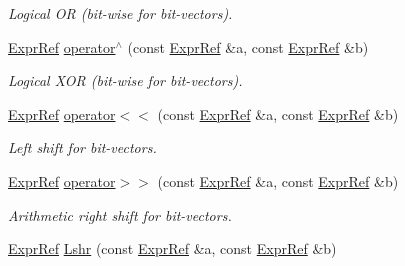 \begin{DoxyCompactItemize}
\begin{DoxyCompactList}\small\item\em Logical OR (bit-\/wise for bit-\/vectors). \end{DoxyCompactList}\item 
\mbox{\label{namespaceilang_ad72e1b0d70d982d3a846436152aef3bc}} 
\mbox{\hyperlink{classilang_1_1_expr_ref}{Expr\+Ref}} \mbox{\hyperlink{namespaceilang_ad72e1b0d70d982d3a846436152aef3bc}{operator$^\wedge$}} (const \mbox{\hyperlink{classilang_1_1_expr_ref}{Expr\+Ref}} \&a, const \mbox{\hyperlink{classilang_1_1_expr_ref}{Expr\+Ref}} \&b)
\begin{DoxyCompactList}\small\item\em Logical X\+OR (bit-\/wise for bit-\/vectors). \end{DoxyCompactList}\item 
\mbox{\label{namespaceilang_ae28e98c027804fa9307f199552870e86}} 
\mbox{\hyperlink{classilang_1_1_expr_ref}{Expr\+Ref}} \mbox{\hyperlink{namespaceilang_ae28e98c027804fa9307f199552870e86}{operator$<$$<$}} (const \mbox{\hyperlink{classilang_1_1_expr_ref}{Expr\+Ref}} \&a, const \mbox{\hyperlink{classilang_1_1_expr_ref}{Expr\+Ref}} \&b)
\begin{DoxyCompactList}\small\item\em Left shift for bit-\/vectors. \end{DoxyCompactList}\item 
\mbox{\label{namespaceilang_ac1848641ecc2609af5de3888328eddb8}} 
\mbox{\hyperlink{classilang_1_1_expr_ref}{Expr\+Ref}} \mbox{\hyperlink{namespaceilang_ac1848641ecc2609af5de3888328eddb8}{operator$>$$>$}} (const \mbox{\hyperlink{classilang_1_1_expr_ref}{Expr\+Ref}} \&a, const \mbox{\hyperlink{classilang_1_1_expr_ref}{Expr\+Ref}} \&b)
\begin{DoxyCompactList}\small\item\em Arithmetic right shift for bit-\/vectors. \end{DoxyCompactList}\item 
\mbox{\label{namespaceilang_acffd757988bbf08aa6ab6395f65de46a}} 
\mbox{\hyperlink{classilang_1_1_expr_ref}{Expr\+Ref}} \mbox{\hyperlink{namespaceilang_acffd757988bbf08aa6ab6395f65de46a}{Lshr}} (const \mbox{\hyperlink{classilang_1_1_expr_ref}{Expr\+Ref}} \&a, const \mbox{\hyperlink{classilang_1_1_expr_ref}{Expr\+Ref}} \&b)

\end{DoxyCompactItemize}
